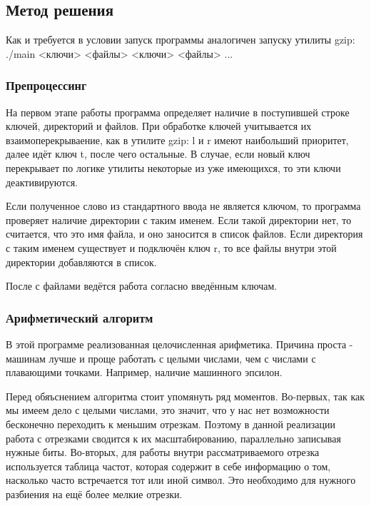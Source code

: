 \documentclass[12pt]{article}
\begin{document}
\subsection*{Метод решения}

Как и требуется в условии запуск программы аналогичен запуску утилиты gzip: ./main <ключи> <файлы> <ключи> <файлы> ...

\subsubsection*{Препроцессинг}

На первом этапе работы программа определяет наличие в поступившей строке ключей, директорий и файлов.
При обработке ключей учитывается их взаимоперекрываение, как в утилите gzip: l и r имеют наибольший приоритет, далее идёт ключ t, после чего остальные. В случае, если новый ключ перекрывает по логике утилиты некоторые из уже имеющихся, то эти ключи деактивируются.

Если полученное слово из стандартного ввода не является ключом, то программа проверяет наличие директории с таким именем. Если такой директории нет, то считается, что это имя файла, и оно заносится в список файлов. Если директория с таким именем существует и подключён ключ r, то все файлы внутри этой директории добавляются в список.

После с файлами ведётся работа согласно введённым ключам.

\subsubsection*{Арифметический алгоритм}

В этой программе реализованная целочисленная арифметика. Причина проста - машинам лучше и проще работать с целыми числами, чем с числами с плавающими точками. Например, наличие машинного эпсилон.

Перед обяъснением алгоритма стоит упомянуть ряд моментов. Во-первых, так как мы имеем дело с целыми числами, это значит, что у нас нет возможности бесконечно переходить к меньшим отрезкам. Поэтому в данной реализации работа с отрезками сводится к их масштабированию, параллельно записывая нужные биты. Во-вторых, для работы внутри рассматриваемого отрезка используется таблица частот, которая содержит в себе информацию о том, насколько часто встречается тот или иной символ. Это необходимо для нужного разбиения на ещё более мелкие отрезки.
\end{document}

